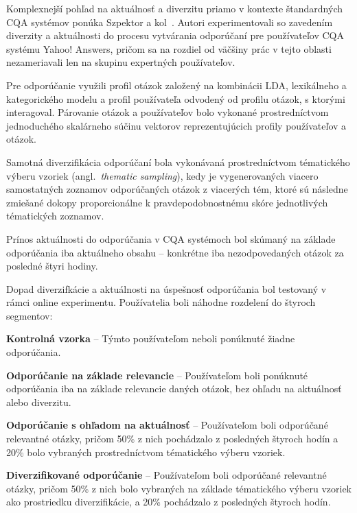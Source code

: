 Komplexnejší pohľad na aktuálnosť a diverzitu priamo v kontexte štandardných CQA systémov ponúka Szpektor a kol~\cite{Szpektor2013}.
Autori experimentovali so zavedením diverzity a aktuálnosti do procesu vytvárania odporúčaní pre používateľov CQA
systému Yahoo! Answers, pričom sa na rozdiel od väčšiny prác v tejto oblasti nezameriavali len na skupinu expertných používateľov.

Pre odporúčanie využili profil otázok založený na kombinácii LDA, lexikálneho a kategorického modelu a profil používateľa
odvodený od profilu otázok, s ktorými interagoval. Párovanie otázok a používateľov bolo vykonané prostredníctvom jednoduchého
skalárneho súčinu vektorov reprezentujúcich profily používateľov a otázok.

Samotná diverzifikácia odporúčaní bola vykonávaná prostredníctvom tématického výberu vzoriek (angl.~\emph{thematic sampling}),
kedy je vygenerovaných viacero samostatných zoznamov odporúčaných otázok z viacerých tém, ktoré sú následne zmiešané dokopy
proporcionálne k pravdepodobnostnému skóre jednotlivých tématických zoznamov.

Prínos aktuálnosti do odporúčania v CQA systémoch bol skúmaný na základe odporúčania iba aktuálneho obsahu -- konkrétne
iba nezodpovedaných otázok za posledné štyri hodiny.

Dopad diverzifkácie a aktuálnosti na úspešnosť odporúčania bol testovaný v rámci online experimentu. Používatelia boli náhodne
rozdelení do štyroch segmentov:

\begin{my_enumerate}
  \item{\textbf{Kontrolná vzorka} -- Týmto používateľom neboli ponúknuté žiadne odporúčania.}
  \item{\textbf{Odporúčanie na základe relevancie} -- Používateľom boli ponúknuté odporúčania iba na základe relevancie
        daných otázok, bez ohľadu na aktuálnosť alebo diverzitu.}
  \item{\textbf{Odporúčanie s ohľadom na aktuálnosť} -- Používateľom boli odporúčané relevantné otázky, pričom 50\% z nich
        pochádzalo z posledných štyroch hodín a 20\% bolo vybraných prostredníctvom tématického výberu vzoriek.}
  \item{\textbf{Diverzifikované odporúčanie} -- Používateľom boli odporúčané relevantné otázky, pričom 50\% z nich
        bolo vybraných na základe tématického výberu vzoriek ako prostriedku diverzifikácie, a 20\% pochádzalo z posledných
        štyroch hodín.}
\end{my_enumerate}

